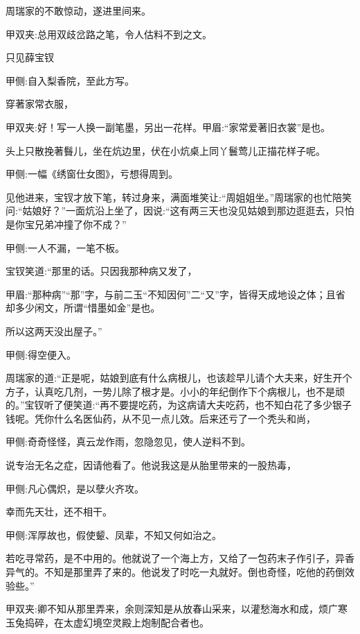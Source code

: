 \begin{parag}
    周瑞家的不敢惊动，遂进里间来。\begin{note}甲双夹:总用双歧岔路之笔，令人估料不到之文。\end{note}只见薛宝钗\begin{note}甲侧:自入梨香院，至此方写。\end{note}穿著家常衣服，\begin{note}甲双夹:好！写一人换一副笔墨，另出一花样。甲眉:“家常爱著旧衣裳”是也。\end{note}头上只散挽著䰖儿，坐在炕边里，伏在小炕桌上同丫鬟莺儿正描花样子呢。\begin{note}甲侧:一幅《绣窗仕女图》，亏想得周到。\end{note}见他进来，宝钗才放下笔，转过身来，满面堆笑让:“周姐姐坐。”周瑞家的也忙陪笑问:“姑娘好？”一面炕沿上坐了，因说:“这有两三天也没见姑娘到那边逛逛去，只怕是你宝兄弟冲撞了你不成？”\begin{note}甲侧:一人不漏，一笔不板。\end{note}宝钗笑道:“那里的话。只因我那种病又发了，\begin{note}甲眉:“那种病”“那”字，与前二玉“不知因何”二“又”字，皆得天成地设之体；且省却多少闲文，所谓“惜墨如金”是也。\end{note}所以这两天没出屋子。”\begin{note}甲侧:得空便入。\end{note}周瑞家的道:“正是呢，姑娘到底有什么病根儿，也该趁早儿请个大夫来，好生开个方子，认真吃几剂，一势儿除了根才是。小小的年纪倒作下个病根儿，也不是顽的。”宝钗听了便笑道:“再不要提吃药，为这病请大夫吃药，也不知白花了多少银子钱呢。凭你什么名医仙药，从不见一点儿效。后来还亏了一个秃头和尚，\begin{note}甲侧:奇奇怪怪，真云龙作雨，忽隐忽见，使人逆料不到。\end{note}说专治无名之症，因请他看了。他说我这是从胎里带来的一股热毒，\begin{note}甲侧:凡心偶炽，是以孽火齐攻。\end{note}幸而先天壮，还不相干。\begin{note}甲侧:浑厚故也，假使颦、凤辈，不知又何如治之。\end{note}若吃寻常药，是不中用的。他就说了一个海上方，又给了一包药末子作引子，异香异气的。不知是那里弄了来的。他说发了时吃一丸就好。倒也奇怪，吃他的药倒效验些。”\begin{note}甲双夹:卿不知从那里弄来，余则深知是从放春山采来，以灌愁海水和成，烦广寒玉兔捣碎，在太虚幻境空灵殿上炮制配合者也。\end{note}
\end{parag}


